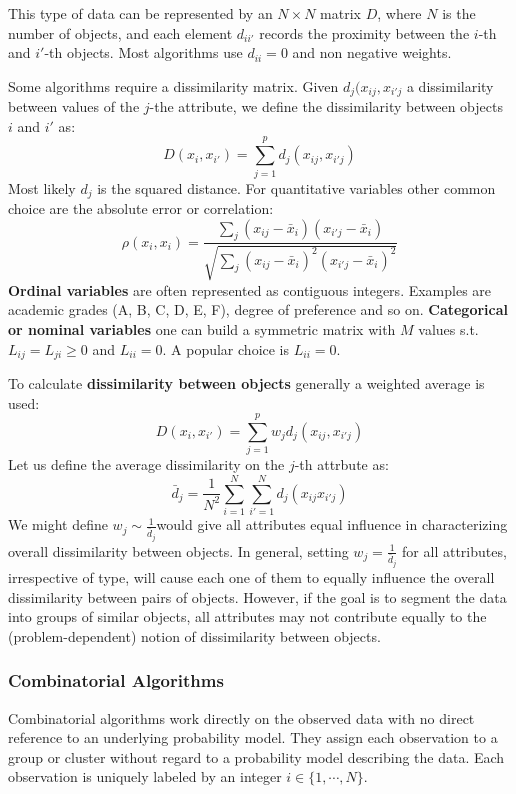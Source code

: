 This type of data can be represented by an $N \times N$ matrix $D$, where $N$ is the number of objects, and each element $d_{ii'}$ records the proximity between the $i$-th and $i'$-th objects. Most algorithms use $d_{ii}= 0$ and non negative weights.

Some algorithms require a dissimilarity matrix. Given $d_j(x_{ij}, x_{i'j}$ a dissimilarity between values of the $j$-the attribute, we define the dissimilarity between objects $i$ and $i'$ as:
\begin{equation}
D(x_i, x_{i'}) = \sum_{j=1}^p d_j (x_{ij}, x_{i'j})
\end{equation}
Most likely $d_j$ is the squared distance. For quantitative variables other common choice are the absolute error or correlation:
\begin{equation}
\rho(x_i, x_{i}) = \frac{\sum_j (x_{ij} - \bar{x}_i)(x_{i'j} - \bar{x}_i)}{\sqrt{\sum_j (x_{ij} - \bar{x}_i)^2(x_{i'j} - \bar{x}_i)^2}}
\end{equation}
\textbf{Ordinal variables} are often represented as contiguous integers. Examples are academic grades (A, B, C, D, E, F), degree of preference and so on. 
\textbf{Categorical or nominal variables} one can build a symmetric matrix with $M$ values s.t. $L_{ij}=L_{ji}\ge 0$ and $L_{ii}=0$. A popular choice is $L_{ii} = 0$.

To calculate \textbf{dissimilarity between objects} generally a weighted average is used:
\begin{equation}
D(x_i, x_{i'}) = \sum_{j=1}^p w_j d_j (x_{ij}, x_{i'j})
\end{equation}
Let us define the average dissimilarity on the $j$-th attrbute as:
\begin{equation}
\bar{d}_j = \frac{1}{N^2}\sum_{i=1}^N\sum_{i'=1}^N d_j(x_{ij}x_{i'j})
\end{equation}
We might define $w_j \sim \frac{1}{\bar{d}_j}$would give all attributes equal influence in characterizing overall dissimilarity between objects. In general, setting $w_j = \frac{1}{\bar{d}_j}$ for all attributes, irrespective of type, 
will cause each one of them to equally influence the overall dissimilarity between pairs of objects. However, if the goal is to segment the data into groups of similar objects, all attributes may not contribute equally to the (problem-dependent) notion of dissimilarity between objects.

\subsubsection{Combinatorial Algorithms}
Combinatorial algorithms work directly on the observed data with no direct reference to an underlying probability model. They assign each observation to a group or cluster without regard to a probability model describing the data. Each observation is uniquely labeled by an integer $i \in \{1,\cdots, N\}$.

